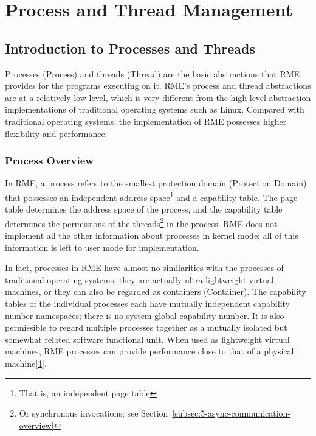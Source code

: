 \chapter{Process and Thread Management}\label{ch:process-and-thread-management}

\section{Introduction to Processes and Threads}\label{sec:4-process-and-thread-overview}

Processes (Process) and threads (Thread) are the basic abstractions that RME provides for the programs executing on it. RME's process and thread abstractions are at a relatively low level, which is very different from the high-level abstraction implementations of traditional operating systems such as Linux. Compared with traditional operating systems, the implementation of RME possesses higher flexibility and performance.

\subsection{Process Overview}\label{subsec:4-process-overview}

In RME, a process refers to the smallest protection domain (Protection
Domain) that possesses an independent address space\footnote{That is, an independent page table} and a capability table. The page table determines the address space of the process, and the capability table determines the permissions of the threads\footnote{Or synchronous invocations; see Section~\ref{subsec:5-async-communication-overview}} in the process. RME does not implement all the other information about processes in kernel mode; all of this information is left to user mode for implementation.

In fact, processes in RME have almost no similarities with the processes of traditional operating systems; they are actually ultra-lightweight virtual machines, or they can also be regarded as containers (Container). The capability tables of the individual processes each have mutually independent capability number namespaces; there is no system-global capability number. It is also permissible to regard multiple processes together as a mutually isolated but somewhat related software functional unit. When used as lightweight virtual machines, RME processes can provide performance close to that of a physical machine\hyperref[cite:4-4]{{[}4{]}}.


